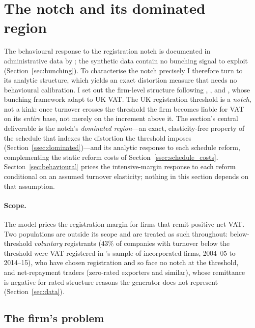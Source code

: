 \section{The notch and its dominated region}
\label{sec:model}

The behavioural response to the registration notch is documented in
administrative data by \citet{liuetal2021}; the synthetic data contain no
bunching signal to exploit (Section~\ref{sec:bunching}). To characterise the
notch precisely I therefore turn to its analytic structure, which yields an
exact distortion measure that needs no behavioural calibration. I set out the
firm-level structure following \citet{klevenwaseem2013}, \citet{saez2010}, and
\citet{kleven2016}, whose bunching framework \citet{liuetal2021} adapt to UK
VAT. The UK registration threshold is a \emph{notch}, not a kink: once
turnover crosses the threshold the firm becomes liable for VAT on its
\emph{entire} base, not merely on the increment above it. The section's
central deliverable is the notch's \emph{dominated region}---an exact,
elasticity-free property of the schedule that indexes the distortion the
threshold imposes (Section~\ref{ssec:dominated})---and its analytic response
to each schedule reform, complementing the static reform costs of
Section~\ref{ssec:schedule_costs}. Section~\ref{sec:behavioural} prices the
intensive-margin response to each reform conditional on an assumed turnover
elasticity; nothing in this section depends on that assumption.

\paragraph{Scope.} The model prices the registration margin for firms that
remit positive net VAT. Two populations are outside its scope and are treated
as such throughout: below-threshold \emph{voluntary} registrants ($43\%$
of companies with turnover below the threshold were VAT-registered in
\citet{liuetal2021}'s sample of incorporated firms, 2004--05 to 2014--15), who have chosen registration and
so face no notch at the threshold, and net-repayment traders (zero-rated
exporters and similar), whose remittance is negative for rated-structure
reasons the generator does not represent (Section~\ref{sec:data}).

\subsection{The firm's problem}

